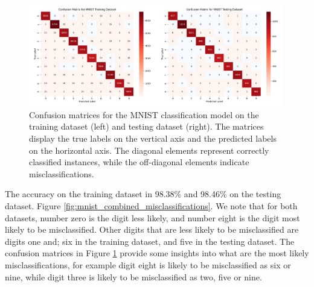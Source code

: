 \begin{figure}[h]
    \centering
    \includegraphics[width=0.99\textwidth]{Figures/Methods/mnist_combined_confusion_matrix.png}
    \caption{Confusion matrices for the MNIST classification model on the training dataset (left) and testing dataset (right). The matrices display the true labels on the vertical axis and the predicted labels on the horizontal axis. The diagonal elements represent correctly classified instances, while the off-diagonal elements indicate misclassifications.}
    \label{fig:mnist_combined_confusion_matrix}
\end{figure}

The accuracy on the training dataset in 98.38\% and 98.46\% on the testing dataset. Figure \ref{fig:mnist_combined_misclassifications}. We note that for both datasets, number zero is the digit less likely, and number eight is the digit most likely to be misclassified. Other digits that are less likely to be misclassified are digits one and; six in the training dataset, and five in the testing dataset. The confusion matrices in Figure \ref{fig:mnist_combined_confusion_matrix} provide some insights into what are the most likely misclassifications, for example digit eight is likely to be misclassified as six or nine, while digit three is likely to be misclassified as two, five or nine.

